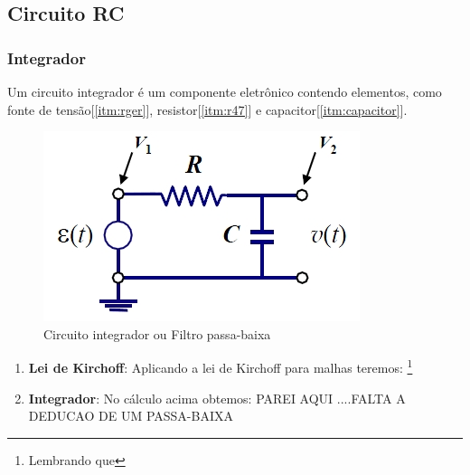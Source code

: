\documentclass[10pt,letterpaper]{article}
\begin{document}
\subsection{Circuito RC}
\subsubsection{Integrador}
Um circuito integrador é um componente eletrônico contendo elementos, como fonte de tensão[\ref{itm:rger}], resistor[\ref{itm:r47}] e capacitor[\ref{itm:capacitor}].
  \begin{figure}[!htb]
    \centering
    \label{impger}
    \includegraphics[scale=0.5]{integrador.jpg}
    \caption{Circuito integrador ou Filtro passa-baixa}
  \end{figure}
\begin{enumerate}[I]
\item \textbf{Lei de Kirchoff}: Aplicando a lei de Kirchoff para malhas teremos: \footnote{Lembrando que }
\item \textbf{Integrador}: No cálculo acima obtemos: 
PAREI AQUI ....FALTA A DEDUCAO DE UM PASSA-BAIXA
\end{enumerate}
\end{document}
